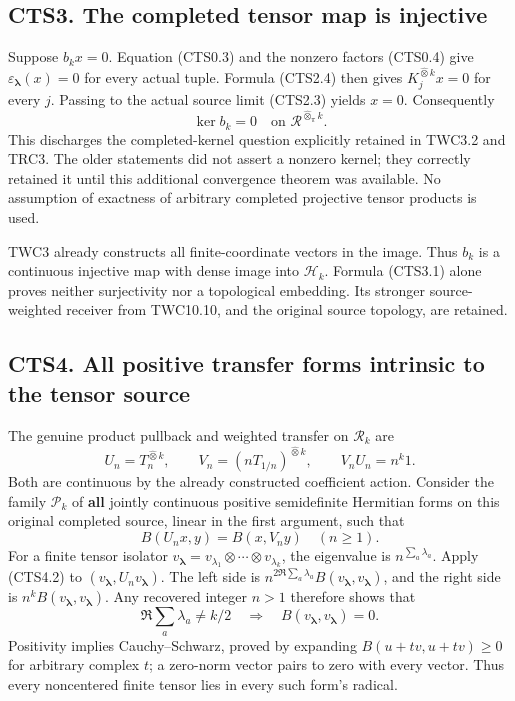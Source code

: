 \subsection{CTS3. The completed tensor map is
injective}\label{cts3.-the-completed-tensor-map-is-injective}

Suppose \(b_kx=0\). Equation (CTS0.3) and the nonzero factors (CTS0.4)
give \(\varepsilon_{\boldsymbol\lambda}(x)=0\) for every actual tuple.
Formula (CTS2.4) then gives \(K_j^{\widehat\otimes k}x=0\) for every
\(j\). Passing to the actual source limit (CTS2.3) yields \(x=0\).
Consequently \[
\boxed{\ker b_k=0\quad\text{on }\mathcal R^{\widehat\otimes_\pi k}.}
\tag{CTS3.1}
\] This discharges the completed-kernel question explicitly retained in
TWC3.2 and TRC3. The older statements did not assert a nonzero kernel;
they correctly retained it until this additional convergence theorem was
available. No assumption of exactness of arbitrary completed projective
tensor products is used.

TWC3 already constructs all finite-coordinate vectors in the image. Thus
\(b_k\) is a continuous injective map with dense image into
\(\mathscr H_k\). Formula (CTS3.1) alone proves neither surjectivity nor
a topological embedding. Its stronger source-weighted receiver from
TWC10.10, and the original source topology, are retained.

\subsection{CTS4. All positive transfer forms intrinsic to the tensor
source}\label{cts4.-all-positive-transfer-forms-intrinsic-to-the-tensor-source}

The genuine product pullback and weighted transfer on \(\mathscr R_k\)
are \[
U_n=T_n^{\widehat\otimes k},\qquad V_n=(nT_{1/n})^{\widehat\otimes k},\qquad V_nU_n=n^k1.
\tag{CTS4.1}
\] Both are continuous by the already constructed coefficient action.
Consider the family \(\mathcal P_k\) of \textbf{all} jointly continuous
positive semidefinite Hermitian forms on this original completed source,
linear in the first argument, such that \[
B(U_nx,y)=B(x,V_ny)\quad(n\ge1).
\tag{CTS4.2}
\] For a finite tensor isolator
\(v_{\boldsymbol\lambda}=v_{\lambda_1}\otimes\cdots\otimes v_{\lambda_k}\),
the eigenvalue is \(n^{\sum_a\lambda_a}\). Apply (CTS4.2) to
\((v_{\boldsymbol\lambda},U_nv_{\boldsymbol\lambda})\). The left side is
\(n^{2\Re\sum_a\lambda_a}B(v_{\boldsymbol\lambda},v_{\boldsymbol\lambda})\),
and the right side is
\(n^k B(v_{\boldsymbol\lambda},v_{\boldsymbol\lambda})\). Any recovered
integer \(n>1\) therefore shows that \[
\Re\sum_a\lambda_a\ne k/2
\quad\Longrightarrow\quad B(v_{\boldsymbol\lambda},v_{\boldsymbol\lambda})=0.
\tag{CTS4.3}
\] Positivity implies Cauchy--Schwarz, proved by expanding
\(B(u+tv,u+tv)\ge0\) for arbitrary complex \(t\); a zero-norm vector
pairs to zero with every vector. Thus every noncentered finite tensor
lies in every such form's radical.

